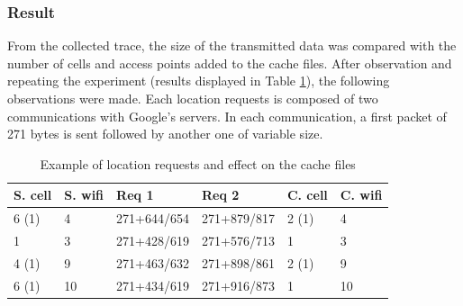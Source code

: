 \subsubsection{Result}

From the collected trace, the size of the transmitted data was compared with the number of cells and access points added to the cache files.
After observation and repeating the experiment (results displayed in Table \ref{tab:expe-req-pattern}), the following observations were made.
Each location requests is composed of two communications with Google's servers.
In each communication, a first packet of 271 bytes is sent followed by another one of variable size.\\


\begin{table}[h]
  \centering
  \begin{tabular}[h]{ |l|l|l|l|l|l|}
    \hline
    S. cell & S. wifi & Req 1 & Req 2 & C. cell & C. wifi \\
    \hline
    6 (1)    &     4 & 271+644/654 & 271+879/817 & 2 (1) & 4 \\
    \hline
    1       &   3  & 271+428/619 & 271+576/713 & 1 & 3 \\
    \hline
    4 (1) & 9 & 271+463/632 & 271+898/861 & 2 (1) & 9 \\
    \hline
    6 (1) & 10 & 271+434/619 & 271+916/873 & 1 & 10 \\
    \hline
  \end{tabular}
  \caption{Example of location requests and effect on the cache files}
  \label{tab:expe-req-pattern}
\end{table}

